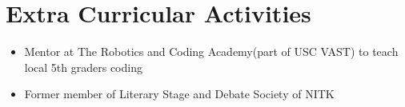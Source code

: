 \newcommand\textlcsc[1]{\textsc{\MakeTextLowercase{#1}}}
\section{Extra Curricular Activities}
\begin{itemize}
\item Mentor at The Robotics and Coding Academy(part of USC VAST) to teach local 5th graders coding
\item Former member of Literary Stage and Debate Society of NITK
\end{itemize}

